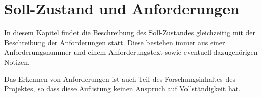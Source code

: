 \section{Soll-Zustand und Anforderungen}\label{sec:Soll}
In diesem Kapitel findet die Beschreibung des Soll-Zustandes gleichzeitig %
mit der Beschreibung der Anforderungen statt. Diese bestehen immer aus einer Anforderungsnummer und einem Anforderungstext sowie eventuell dazugehörigen Notizen.\par
Das Erkennen von Anforderungen ist auch Teil des Forschungsinhaltes des Projektes, so dass diese Auflistung keinen Anspruch auf Vollständigkeit hat.

